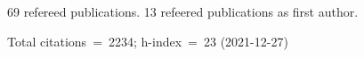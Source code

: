 69 refereed publications. 13 refeered publications as first author.

Total citations~=~2234; h-index~=~23 (2021-12-27)